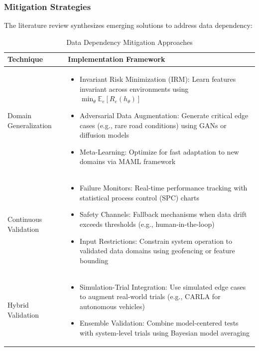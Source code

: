 \documentclass[manuscript,screen,review]{acmart}
\begin{document}
\subsubsection{Mitigation Strategies}
The literature review synthesizes emerging solutions to address data dependency:

\begin{table}[h]
\centering
\caption{Data Dependency Mitigation Approaches}
\label{tab:mitigation}
\begin{tabular}{p{}p{}}
\hline
\textbf{Technique} & \textbf{Implementation Framework} \\
\hline
Domain Generalization & \begin{itemize}
    \item Invariant Risk Minimization (IRM): Learn features invariant across environments using $\min_{\theta}\mathbb{E}_{e}[R_{e}(h_{\theta})]$
    \item Adversarial Data Augmentation: Generate critical edge cases (e.g., rare road conditions) using GANs or diffusion models
    \item Meta-Learning: Optimize for fast adaptation to new domains via MAML framework
\end{itemize} \\
\hline
Continuous Validation & \begin{itemize}
    \item Failure Monitors: Real-time performance tracking with statistical process control (SPC) charts
    \item Safety Channels: Fallback mechanisms when data drift exceeds thresholds (e.g., human-in-the-loop)
    \item Input Restrictions: Constrain system operation to validated data domains using geofencing or feature bounding
\end{itemize} \\
\hline
Hybrid Validation & \begin{itemize}
    \item Simulation-Trial Integration: Use simulated edge cases to augment real-world trials (e.g., CARLA for autonomous vehicles)
    \item Ensemble Validation: Combine model-centered tests with system-level trials using Bayesian model averaging
\end{itemize} \\
\hline
\end{tabular}
\end{table}
\end{document}
